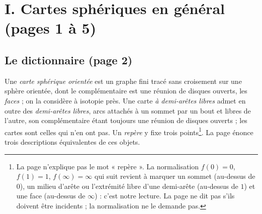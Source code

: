 \documentclass[11pt,a4paper]{article}
\begin{document}
\section*{I. Cartes sphériques en général (pages 1 à 5)}

\subsection*{Le dictionnaire (page 2)}

Une \emph{carte sphérique orientée} est un graphe fini tracé sans croisement
sur une sphère orientée, dont le complémentaire est une réunion de disques
ouverts, les \emph{faces} ; on la considère à isotopie près. Une carte
\emph{à demi-arêtes libres} admet en outre des \emph{demi-arêtes libres},
arcs attachés à un sommet par un bout et libres de l'autre, son
complémentaire étant toujours une réunion de disques ouverts ; les cartes
sont celles qui n'en ont pas. Un \emph{repère}
y fixe trois points\footnote{La page n'explique pas le mot « repère ». La
normalisation $f(0)=0$, $f(1)=1$, $f(\infty)=\infty$ qui suit revient à
marquer un sommet (au-dessus de $0$), un milieu d'arête ou l'extrémité libre
d'une demi-arête (au-dessus de $1$) et une face (au-dessus de $\infty$) :
c'est notre lecture. La page ne dit pas s'ils doivent être incidents ; la
normalisation ne le demande pas.}. La page énonce trois descriptions
équivalentes de ces objets.
\end{document}
